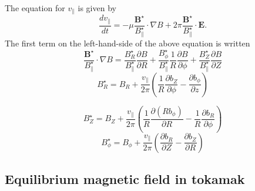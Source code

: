 \documentclass{article}
\begin{document}
The equation for $v_{\parallel}$ is given by
\begin{equation}
  \frac{d v_{\parallel}}{d t} = - \mu
  \frac{\mathbf{B}^{\star}}{B^{\star}_{\parallel}} \cdot \nabla B + 2 \pi
  \frac{\mathbf{B}^{\star}}{B^{\star}_{\parallel}} \cdot \mathbf{E}.
\end{equation}
The first term on the left-hand-side of the above equation is written
\begin{equation}
  \frac{\mathbf{B}^{\star}}{B^{\star}_{\parallel}} \cdot \nabla B =
  \frac{B^{\star}_R}{B^{\star}_{\parallel}}  \frac{\partial B}{\partial R} +
  \frac{B^{\star}_{\phi}}{B^{\star}_{\parallel}}  \frac{1}{R}  \frac{\partial
  B}{\partial \phi} + \frac{B^{\star}_Z}{B^{\star}_{\parallel}} 
  \frac{\partial B}{\partial Z}
\end{equation}
\begin{equation}
  B^{\star}_R = B_R + \frac{v_{\parallel}}{2 \pi} \left( \frac{1}{R} 
  \frac{\partial b_Z}{\partial \phi} - \frac{\partial b_{\phi}}{\partial z}
  \right)
\end{equation}

\begin{equation}
  B^{\star}_Z = B_Z + \frac{v_{\parallel}}{2 \pi} \left( \frac{1}{R} 
  \frac{\partial (R b_{\phi})}{\partial R} - \frac{1}{R}  \frac{\partial
  b_R}{\partial \phi} \right)
\end{equation}
\begin{equation}
  B^{\star}_{\phi} = B_{\phi} + \frac{v_{\parallel}}{2 \pi} \left( 
  \frac{\partial b_R}{\partial Z} - \frac{\partial b_Z}{\partial R} \right)
\end{equation}


\subsection{Equilibrium magnetic field in tokamak}
\end{document}
